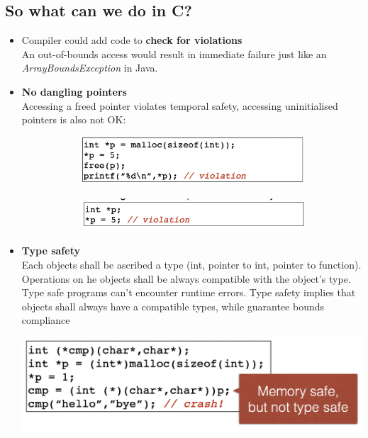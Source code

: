 \documentclass[11pt, oneside]{article}   	%
\begin{document}
\subsection*{So what can we do in C?}
\begin{itemize}
\item Compiler could add code to \textbf{check for violations}\\
An out-of-bounds access would result in immediate failure just like an \emph{ArrayBoundsException} in Java.
\item \textbf{No dangling pointers}\\
Accessing a freed pointer violates temporal safety, accessing uninitialised pointers is also not OK:
\begin{figure}[H]
\begin{subfigure}[H]{0.5\linewidth}
\includegraphics[width=\linewidth]{sef1}
\end{subfigure}
\begin{subfigure}[H]{0.5\linewidth}
\includegraphics[width=\linewidth]{sef2}
\end{subfigure}%
\end{figure}
\item \textbf{Type safety}\\
Each objects shall be ascribed a type (int, pointer to int, pointer to function).\\
Operations on he objects shall be always compatible with the object's type. Type safe programs can't encounter runtime errors. Type safety implies that objects shall always have a compatible types, while guarantee bounds compliance
\begin{center}
\includegraphics[scale = 0.6]{tsef}
\end{center}
\end{itemize}
\end{document}

